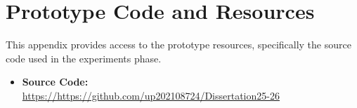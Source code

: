 \chapter{Prototype Code and Resources}
\label{app:prototype_code}

This appendix provides access to the prototype resources, specifically the source code used in the experiments phase.

\begin{itemize}
    \item \textbf{Source Code:} \\ \url{https://https://github.com/up202108724/Dissertation25-26}
\end{itemize}